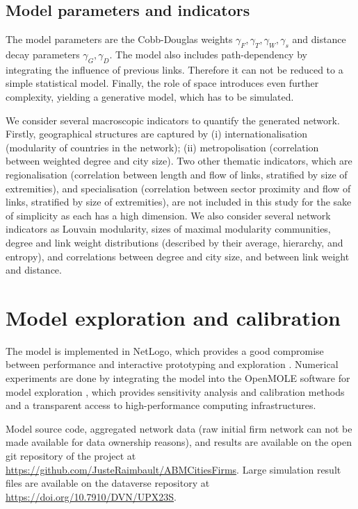 \documentclass[11pt]{article}
\begin{document}
\subsection{Model parameters and indicators}


The model parameters are the Cobb-Douglas weights $\gamma_F,\gamma_T,\gamma_W,\gamma_s$ and distance decay parameters $\gamma_G,\gamma_D$. The model also includes path-dependency by integrating the influence of previous links. Therefore it can not be reduced to a simple statistical model. Finally, the role of space introduces even further complexity, yielding a generative model, which has to be simulated.

We consider several macroscopic indicators to quantify the generated network. Firstly, geographical structures are captured by (i) internationalisation (modularity of countries in the network); (ii) metropolisation (correlation between weighted degree and city size). Two other thematic indicators, which are regionalisation (correlation between length and flow of links, stratified by size of extremities), and specialisation (correlation between sector proximity and flow of links, stratified by size of extremities), are not included in this study for the sake of simplicity as each has a high dimension. We also consider several network indicators as Louvain modularity, sizes of maximal modularity communities, degree and link weight distributions (described by their average, hierarchy, and entropy), and correlations between degree and city size, and between link weight and distance.



\section{Model exploration and calibration}

The model is implemented in NetLogo, which provides a good compromise between performance and interactive prototyping and exploration \cite{railsback2017improving}. Numerical experiments are done by integrating the model into the OpenMOLE software for model exploration \cite{reuillon2013openmole}, which provides sensitivity analysis and calibration methods and a transparent access to high-performance computing infrastructures.

Model source code, aggregated network data (raw initial firm network can not be made available for data ownership reasons), and results are available on the open git repository of the project at \url{https://github.com/JusteRaimbault/ABMCitiesFirms}. Large simulation result files are available on the dataverse repository at \url{https://doi.org/10.7910/DVN/UPX23S}.
\end{document}
